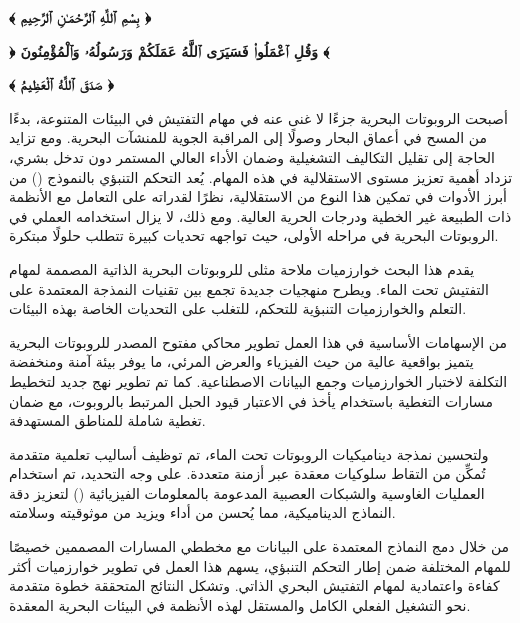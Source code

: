 
\begin{center}
    \begin{RLtext}
        \noindent\textbf{﴾ بِسْمِ ٱللَّهِ ٱلرَّحْمَـٰنِ ٱلرَّحِيمِ ﴿}
        
        \vspace{0.3cm}
        
        \noindent\textbf{﴿ وَقُلِ ٱعْمَلُوا۟ فَسَيَرَى ٱللَّهُ عَمَلَكُمْ وَرَسُولُهُۥ وَٱلْمُؤْمِنُونَ ﴾}
        
        \vspace{0.3cm}
        
        \noindent\textbf{﴾ صَدَقَ ٱللَّهُ ٱلْعَظِيمُ ﴿}
    \end{RLtext}
    \vspace{0.5cm}
\end{center}

\begin{RLtext}
أصبحت الروبوتات البحرية جزءًا لا غنى عنه في مهام التفتيش في البيئات المتنوعة، بدءًا من المسح في أعماق البحار وصولًا إلى المراقبة الجوية للمنشآت البحرية. ومع تزايد الحاجة إلى تقليل التكاليف التشغيلية وضمان الأداء العالي المستمر دون تدخل بشري، تزداد أهمية تعزيز مستوى الاستقلالية في هذه المهام. يُعد التحكم التنبؤي بالنموذج () من أبرز الأدوات في تمكين هذا النوع من الاستقلالية، نظرًا لقدراته على التعامل مع الأنظمة ذات الطبيعة غير الخطية ودرجات الحرية العالية. ومع ذلك، لا يزال استخدامه العملي في الروبوتات البحرية في مراحله الأولى، حيث تواجهه تحديات كبيرة تتطلب حلولًا مبتكرة.

يقدم هذا البحث خوارزميات ملاحة مثلى للروبوتات البحرية الذاتية المصممة لمهام التفتيش تحت الماء. ويطرح منهجيات جديدة تجمع بين تقنيات النمذجة المعتمدة على التعلم والخوارزميات التنبؤية للتحكم، للتغلب على التحديات الخاصة بهذه البيئات.

من الإسهامات الأساسية في هذا العمل تطوير محاكي مفتوح المصدر للروبوتات البحرية يتميز بواقعية عالية من حيث الفيزياء والعرض المرئي، ما يوفر بيئة آمنة ومنخفضة التكلفة لاختبار الخوارزميات وجمع البيانات الاصطناعية. كما تم تطوير نهج جديد لتخطيط مسارات التغطية باستخدام  يأخذ في الاعتبار قيود الحبل المرتبط بالروبوت، مع ضمان تغطية شاملة للمناطق المستهدفة.

ولتحسين نمذجة ديناميكيات الروبوتات تحت الماء، تم توظيف أساليب تعلمية متقدمة تُمكِّن من التقاط سلوكيات معقدة عبر أزمنة متعددة. على وجه التحديد، تم استخدام العمليات الغاوسية والشبكات العصبية المدعومة بالمعلومات الفيزيائية () لتعزيز دقة النماذج الديناميكية، مما يُحسن من أداء  ويزيد من موثوقيته وسلامته.

من خلال دمج النماذج المعتمدة على البيانات مع مخططي المسارات المصممين خصيصًا للمهام المختلفة ضمن إطار التحكم التنبؤي، يسهم هذا العمل في تطوير خوارزميات أكثر كفاءة واعتمادية لمهام التفتيش البحري الذاتي. وتشكل النتائج المتحققة خطوة متقدمة نحو التشغيل الفعلي الكامل والمستقل لهذه الأنظمة في البيئات البحرية المعقدة.
\end{RLtext}


